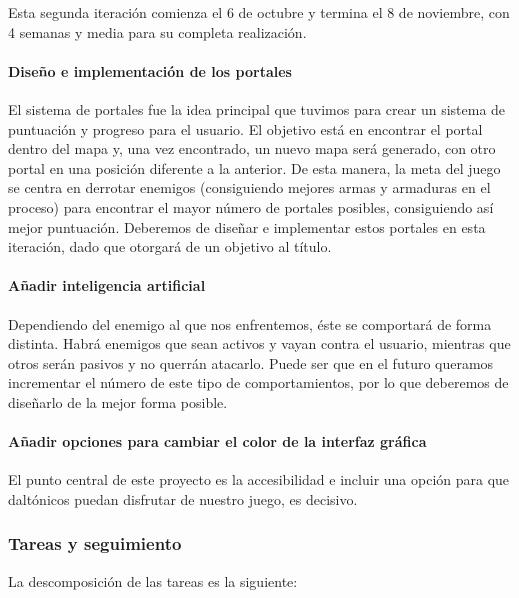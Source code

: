 Esta segunda iteración comienza el 6 de octubre y termina el 8 de noviembre, con 4 semanas y media para su completa realización.

\paragraph{Diseño e implementación de los portales} El sistema de portales fue la idea principal que tuvimos para crear un sistema de puntuación y progreso para el usuario. El objetivo está en encontrar el portal dentro del mapa y, una vez encontrado, un nuevo mapa será generado, con otro portal en una posición diferente a la anterior. De esta manera, la meta del juego se centra en derrotar enemigos (consiguiendo mejores armas y armaduras en el proceso) para encontrar el mayor número de portales posibles, consiguiendo así mejor puntuación.
Deberemos de diseñar e implementar estos portales en esta iteración, dado que otorgará de un objetivo al título.

\paragraph{Añadir inteligencia artificial} Dependiendo del enemigo al que nos enfrentemos, éste se comportará de forma distinta. Habrá enemigos que sean activos y vayan contra el usuario, mientras que otros serán pasivos y no querrán atacarlo. Puede ser que en el futuro queramos incrementar el número de este tipo de comportamientos, por lo que deberemos de diseñarlo de la mejor forma posible.

\paragraph{Añadir opciones para cambiar el color de la interfaz gráfica} El punto central de este proyecto es la accesibilidad e incluir una opción para que daltónicos puedan disfrutar de nuestro juego, es decisivo.

\subsubsection{Tareas y seguimiento}

La descomposición de las tareas es la siguiente:


